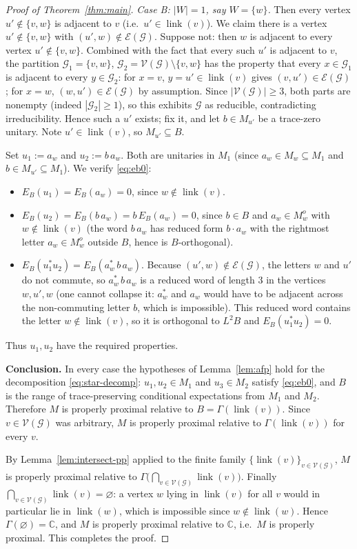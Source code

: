 \documentclass[a4paper, 11pt, reqno]{amsart}
\numberwithin{equation}{section}
\theoremstyle{plain}
\theoremstyle{remark}
\theoremstyle{definition}
\newcommand{\C}{\mathbb{C}}
\newcommand{\VV}{{\mathcal V}}
\newcommand{\EE}{{\mathcal E}}
\newcommand{\GG}{{\mathcal G}}
\begin{document}
\begin{proof}[Proof of Theorem~\ref{thm:main}]
\emph{Case B: $|W|=1$, say $W=\{w\}$.} Then every vertex $u'\notin\{v,w\}$ is adjacent to $v$ (i.e.\ $u'\in\operatorname{link}(v)$). We claim there is a vertex $u'\notin\{v,w\}$ with $(u',w)\notin\EE(\GG)$. Suppose not: then $w$ is adjacent to every vertex $u'\notin\{v,w\}$. Combined with the fact that every such $u'$ is adjacent to $v$, the partition $\GG_1=\{v,w\}$, $\GG_2=\VV(\GG)\setminus\{v,w\}$ has the property that every $x\in\GG_1$ is adjacent to every $y\in\GG_2$: for $x=v$, $y=u'\in\operatorname{link}(v)$ gives $(v,u')\in\EE(\GG)$; for $x=w$, $(w,u')\in\EE(\GG)$ by assumption. Since $|\VV(\GG)|\ge3$, both parts are nonempty (indeed $|\GG_2|\ge1$), so this exhibits $\GG$ as reducible, contradicting irreducibility. Hence such a $u'$ exists; fix it, and let $b\in M_{u'}$ be a trace-zero unitary. Note $u'\in\operatorname{link}(v)$, so $M_{u'}\subseteq B$.

Set $u_1:=a_w$ and $u_2:=b\,a_w$. Both are unitaries in $M_1$ (since $a_w\in M_w\subseteq M_1$ and $b\in M_{u'}\subseteq M_1$). We verify \eqref{eq:eb0}:
\begin{itemize}
\item $E_B(u_1)=E_B(a_w)=0$, since $w\notin\operatorname{link}(v)$.
\item $E_B(u_2)=E_B(b\,a_w)=b\,E_B(a_w)=0$, since $b\in B$ and $a_w\in M_w^o$ with $w\notin\operatorname{link}(v)$ (the word $b\,a_w$ has reduced form $b\cdot a_w$ with the rightmost letter $a_w\in M_w^o$ outside $B$, hence is $B$-orthogonal).
\item $E_B(u_1^*u_2)=E_B(a_w^*\,b\,a_w)$. Because $(u',w)\notin\EE(\GG)$, the letters $w$ and $u'$ do not commute, so $a_w^*\,b\,a_w$ is a reduced word of length $3$ in the vertices $w,u',w$ (one cannot collapse it: $a_w^*$ and $a_w$ would have to be adjacent across the non-commuting letter $b$, which is impossible). This reduced word contains the letter $w\notin\operatorname{link}(v)$, so it is orthogonal to $L^2B$ and $E_B(u_1^*u_2)=0$.
\end{itemize}
Thus $u_1,u_2$ have the required properties.

\medskip\noindent\textbf{Conclusion.}
In every case the hypotheses of Lemma~\ref{lem:afp} hold for the decomposition \eqref{eq:star-decomp}: $u_1,u_2\in M_1$ and $u_3\in M_2$ satisfy \eqref{eq:eb0}, and $B$ is the range of trace-preserving conditional expectations from $M_1$ and $M_2$. Therefore $M$ is properly proximal relative to $B=\Gamma(\operatorname{link}(v))$. Since $v\in\VV(\GG)$ was arbitrary, $M$ is properly proximal relative to $\Gamma(\operatorname{link}(v))$ for every $v$.

By Lemma~\ref{lem:intersect-pp} applied to the finite family $\{\operatorname{link}(v)\}_{v\in\VV(\GG)}$, $M$ is properly proximal relative to $\Gamma\big(\bigcap_{v\in\VV(\GG)}\operatorname{link}(v)\big)$. Finally $\bigcap_{v\in\VV(\GG)}\operatorname{link}(v)=\varnothing$: a vertex $w$ lying in $\operatorname{link}(v)$ for all $v$ would in particular lie in $\operatorname{link}(w)$, which is impossible since $w\notin\operatorname{link}(w)$. Hence $\Gamma(\varnothing)=\C$, and $M$ is properly proximal relative to $\C$, i.e.\ $M$ is properly proximal. This completes the proof.
\end{proof}
\end{document}
